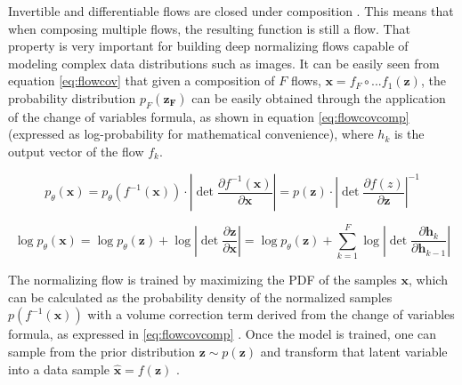 Invertible and differentiable flows are closed under composition \autocite{kobyzev}. This means that when composing multiple flows, the resulting function is still a flow. That property is very important for building deep normalizing flows capable of modeling complex data distributions such as images. It can be easily seen from equation \ref{eq:flowcov}  \autocite{rezende2015} that given a composition of $F$ flows, $\mathbf{x}=f_F \circ ... f_1(\mathbf{z})$, the probability distribution $p_F(\mathbf{z_F})$ can be easily obtained through the application of the change of variables formula, as shown in equation \ref{eq:flowcovcomp} (expressed as log-probability for mathematical convenience), where $h_k$ is the output vector of the flow $f_k$.


\begin{equation}
\label{eq:flowcov}
p_\theta(\mathbf{x}) = p_\theta(f^{-1}(\mathbf{x})) \cdot \left| \det \frac{\partial f^{-1}(\mathbf{x})}{\partial \mathbf{x}} \right| = p(\mathbf{z}) \cdot \left| \det \frac{\partial f(z)}{\partial \mathbf{z}} \right|^{-1}
\end{equation}


\begin{equation}
\label{eq:flowcovcomp}
\log p_\theta(\mathbf{x}) 
= \log p_\theta(\mathbf{z}) + \log  \left| \det \frac{\partial \mathbf{z}}{\partial \mathbf{x}} \right| 
= \log p_\theta(\mathbf{z}) + \sum_{k=1}^{F} \log  \left| \det \frac{\partial \mathbf{h}_k}{\partial \mathbf{h}_{k-1}} \right| 
\end{equation}


The normalizing flow is trained by maximizing the PDF of the samples $\mathbf{x}$, which can be calculated as the probability density of the normalized samples $p(f^{-1}(\mathbf{x}))$ with a volume correction term derived from the change of variables formula, as expressed in \ref{eq:flowcovcomp} \autocite{papamakarios2017}. Once the model is trained, one can sample from the prior distribution $\mathbf{z} \sim p(\mathbf{z})$ and transform that latent variable into a data sample $\hat{\mathbf{x}} = f(\mathbf{z})$ \autocite{rezende2015}.

